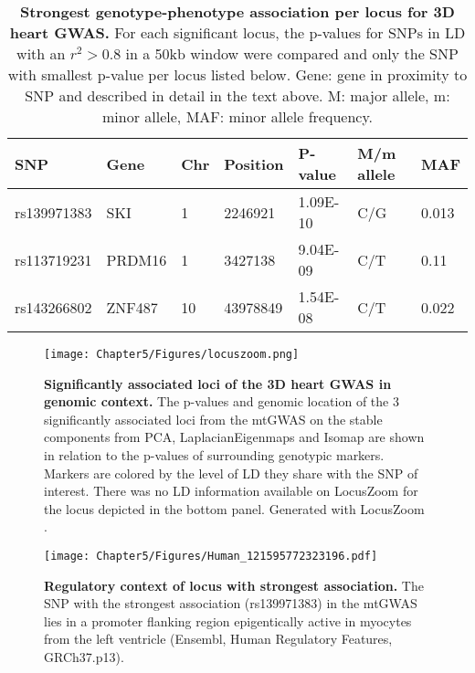 \begin{table}[htbp]
  \centering
  \caption[\textbf{Strongest genotype-phenotype association per locus for 3D heart GWAS. }]{\textbf{Strongest genotype-phenotype association per locus for 3D heart GWAS. } For each significant locus, the p-values for SNPs in LD with an \(r^2 > 0.8\) in a \num{50}kb window were compared and only the SNP with smallest p-value per locus listed below. Gene: gene in proximity to SNP and described in detail in the text above. M: major allele, m:  minor allele, MAF: minor allele frequency. }
  \begin{small}
    \begin{tabular}{lllllll}
    \toprule
    SNP   & Gene & Chr   & Position & P-value &  M/m allele & MAF \\
    \midrule
    rs139971383 & SKI & \num{1} & \num{2246921} & \num{1.09E-10} & C/G     & \num{0.013} \\
    rs113719231 & PRDM16 & \num{1} & \num{3427138} & \num{9.04E-09} & C/T     & \num{0.11} \\
    rs143266802 & ZNF487 & \num{10} & \num{43978849} & \num{1.54E-08} & C/T     & \num{0.022} \\
    \bottomrule
    \end{tabular}%
    \end{small}
  \label{tab:gwas-heart}%
\end{table}%
%
\begin{figure}[hbtp]
	\centering
	\texttt{[image: Chapter5/Figures/locuszoom.png]}
	\caption[\textbf{Significantly associated loci of the 3D heart GWAS in genomic context. }]{\textbf{Significantly associated loci of the 3D heart GWAS in genomic context. }The p-values and genomic location of the \num{3} significantly associated loci from the mtGWAS on the stable components from PCA, LaplacianEigenmaps and Isomap are shown in relation to the p-values of surrounding genotypic markers. Markers are colored by the level of LD they share with the SNP of interest. There was no LD information available on LocusZoom for the locus depicted in the bottom panel. Generated with LocusZoom \citep{Pruim2010}.}  
	 	\label{fig:locuszoom-heart}
\end{figure}
%
\begin{figure}[hbtp]
	\centering
	\texttt{[image: Chapter5/Figures/Human\_121595772323196.pdf]}
	\caption[\textbf{Regulatory context of locus with strongest association. }]{\textbf{Regulatory context of locus with strongest association. } The SNP with the strongest association (rs139971383) in the mtGWAS lies in a promoter flanking region epigentically active in myocytes from the left ventricle (Ensembl, Human Regulatory Features, GRCh37.p13). } 
	 	\label{fig:regulatory-heart}
\end{figure}
